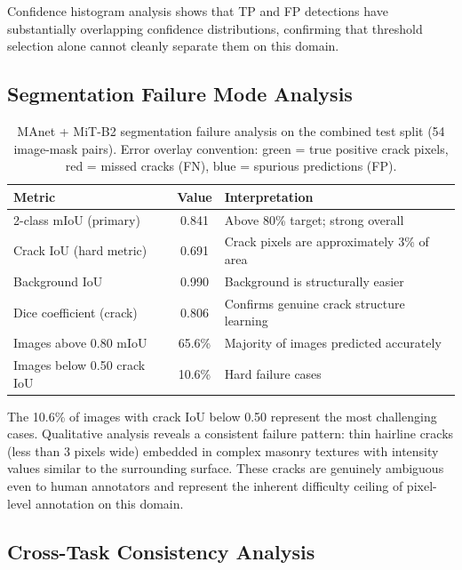 \documentclass[12pt,a4paper]{article}
\begin{document}
Confidence histogram analysis shows that TP and FP detections have substantially overlapping confidence distributions, confirming that threshold selection alone cannot cleanly separate them on this domain.

\subsection{Segmentation Failure Mode Analysis}

\begin{table}[H]
\centering
\caption{MAnet + MiT-B2 segmentation failure analysis on the combined test split (54 image-mask pairs). Error overlay convention: green = true positive crack pixels, red = missed cracks (FN), blue = spurious predictions (FP).}
\label{tab:seg_fail}
\begin{tabular}{lcl}
\toprule
\rowcolor{white}
\textbf{Metric} & \textbf{Value} & \textbf{Interpretation} \\
\midrule
2-class mIoU (primary) & 0.841 & Above 80\% target; strong overall \\
Crack IoU (hard metric) & 0.691 & Crack pixels are approximately 3\% of area \\
Background IoU & 0.990 & Background is structurally easier \\
Dice coefficient (crack) & 0.806 & Confirms genuine crack structure learning \\
Images above 0.80 mIoU & 65.6\% & Majority of images predicted accurately \\
Images below 0.50 crack IoU & 10.6\% & Hard failure cases \\
\bottomrule
\end{tabular}
\end{table}

The 10.6\% of images with crack IoU below 0.50 represent the most challenging cases. Qualitative analysis reveals a consistent failure pattern: thin hairline cracks (less than 3 pixels wide) embedded in complex masonry textures with intensity values similar to the surrounding surface. These cracks are genuinely ambiguous even to human annotators and represent the inherent difficulty ceiling of pixel-level annotation on this domain.

\subsection{Cross-Task Consistency Analysis}
\end{document}
